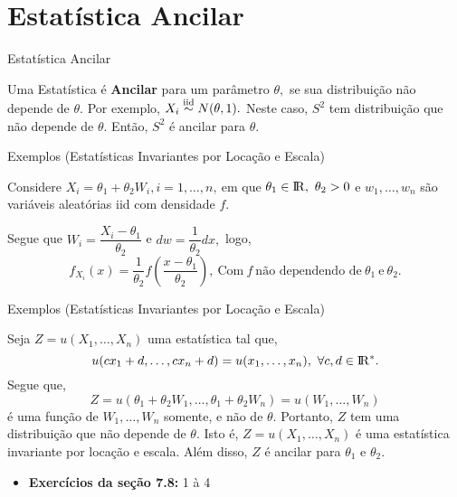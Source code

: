 \documentclass[12pt]{beamer}
\begin{document}
\section{Estatística Ancilar}
\begin{frame}{Estatística Ancilar}
\begin{block}{}
\justifying
Uma Estatística é \textbf{Ancilar} para um parâmetro $\theta,$ se sua distribuição não depende de $\theta.$ Por exemplo, $X_{i}\overset{\text{iid}}{\sim} N(\theta,1).$ Neste caso, $S^{2}$ tem distribuição que não depende de $\theta.$ Então, $S^{2}$ é ancilar para $\theta.$
\end{block}
\end{frame}

\begin{frame}{Exemplos (Estatísticas Invariantes por Locação e Escala)}
\begin{block}{}
\justifying
Considere $X_{i}=\theta_{1}+\theta_{2}W_{i},i=1,\ldots,n,~$em que $\theta_{1}\in \rm I\!R,~\theta_{2}>0$ e $w_{1},\ldots,w_{n}$ são variáveis aleatórias iid com densidade $f.$
\end{block}
\pause
\begin{block}{}
\justifying
Segue que $W_{i}=\dfrac{X_{i}-\theta_{1}}{\theta_{2}}$ e $dw=\dfrac{1}{\theta_{2}}dx,$ logo,
$$f_{X_{i}}(x)=\dfrac{1}{\theta_{2}}f(\dfrac{x-\theta_{1}}{\theta_{2}}),~\text{Com}~f~\text{não dependendo de}~\theta_{1}~\text{e}~\theta_{2}.$$
\end{block}
\end{frame}

\begin{frame}{Exemplos (Estatísticas Invariantes por Locação e Escala)}
\begin{block}{}
\justifying
Seja $Z=u(X_{1},\ldots,X_{n})$ uma estatística tal que,
$$u(cx_{1}+d,\ldots,cx_{n}+d)=u(x_{1},\ldots,x_{n}),~\forall c,d\in \rm I\!R^{*}.$$
Segue que, 
$$Z=u(\theta_{1}+\theta_{2}W_{1},\ldots,\theta_{1}+\theta_{2}W_{n})=u(W_{1},\ldots,W_{n})$$ é uma função de $W_{1},\ldots,W_{n}$ somente, e não de $\theta.$ Portanto, $Z$ tem uma distribuição que não depende de $\theta.$ Isto é, $Z=u(X_{1},\ldots,X_{n})$ é uma estatística invariante por locação e escala. Além disso, $Z$ é ancilar para $\theta_{1}$ e $\theta_{2}.$
\end{block}
\end{frame}

\begin{frame}{}
\begin{block}{\Home}
\justifying
\begin{itemize}
    \item \textbf{Exercícios da seção 7.8:} 1 à 4
\end{itemize}
\end{block}
\end{frame}
\end{document}
